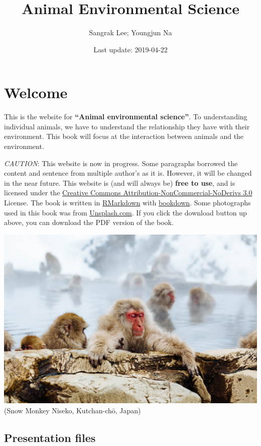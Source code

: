 \documentclass[]{book}
\title{Animal Environmental Science}
\author{Sangrak Lee; Youngjun Na}
\date{Last update: 2019-04-22}
\begin{document}
\maketitle

{
\setcounter{tocdepth}{1}
\tableofcontents
}
\chapter*{Welcome}\label{welcome}

This is the website for \textbf{``Animal environmental science''}. To
understanding individual animals, we have to understand the relationship
they have with their environment. This book will focus at the
interaction between animals and the environment.

\emph{CAUTION}: This website is now in progress. Some paragraphs
borrowed the content and sentence from multiple author's as it is.
However, it will be changed in the near future. This website is (and
will always be) \textbf{free to use}, and is licensed under the
\href{http://creativecommons.org/licenses/by-nc-nd/3.0/us/}{Creative
Commons Attribution-NonCommercial-NoDerivs 3.0} License. The book is
written in \href{https://rmarkdown.rstudio.com}{RMarkdown} with
\href{https://bookdown.org}{bookdown}. Some photographs used in this
book was from \href{https://unsplash.com/}{Unsplash.com}. If you click
the download button up above, you can download the PDF version of the
book.

\includegraphics{figures/monkey.jpeg}\\
(Snow Monkey Niseko, Kutchan-chō, Japan)

\section{Presentation files}\label{presentation-files}
\end{document}
